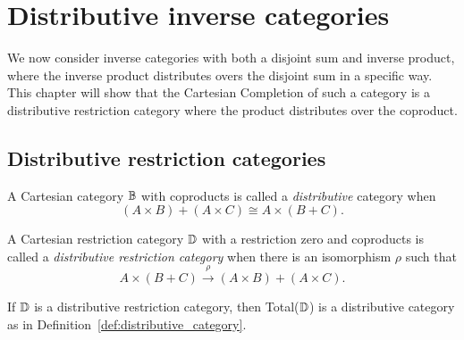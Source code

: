 
\chapter{Distributive inverse categories} %
\label{chap:distributive_inverse_categories}
We now consider inverse categories with both a disjoint sum and inverse product, where the inverse
product distributes overs the disjoint sum in a specific way. This chapter will show that the
Cartesian Completion of such a category is a distributive restriction category where the product
distributes over the coproduct.

\section{Distributive restriction categories} %
\label{sec:distributive_restriction_categories}

\begin{definition}\label{def:distributive_category}
  A Cartesian category $\mathbb{B}$ with coproducts is called a
  \emph{distributive}\cite{cockett1993-introduction-distributive} category when
  \[
    (A\times B) + (A\times C) \cong A \times (B+ C).
  \]
\end{definition}

\begin{definition}\label{def:distributive_restriction_category}
  A Cartesian restriction category $\mathbb{D}$ with a restriction zero and coproducts is called a
  \emph{distributive restriction category}\cite{cockettlack2004:restcategories3}
  when there is an isomorphism $\rho$ such that
  \[
    A\times (B+C) \xrightarrow{\rho} (A\times B) +(A\times C).
  \]
\end{definition}

If $\mathbb{D}$ is a distributive restriction category, then Total($\mathbb{D}$) is a distributive
category as in Definition~\ref{def:distributive_category}.


